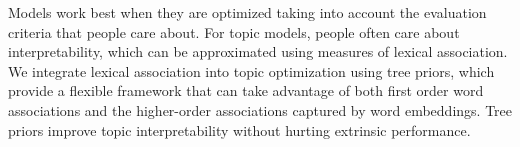 Models work best when they are optimized taking into account the evaluation criteria that people care about. For topic models, people often care about interpretability, which can be approximated using measures of lexical association. We integrate lexical association into topic optimization using tree priors, which provide a flexible framework that can take advantage of both first order word associations and the higher-order associations captured by word embeddings. Tree priors improve topic interpretability without hurting extrinsic performance.

